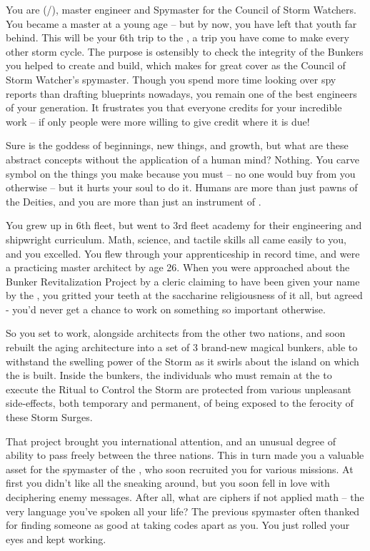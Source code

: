 \documentclass[char]{GL2020}
\begin{document}
\name{\cBunker{}}

You are \cBunker{\full} (\cBunker{\they}/\cBunker{\them}), master engineer and Spymaster for the \pShip{} Council of Storm Watchers. You became a master at a young age -- but by now, you have left that youth far behind. This will be your 6th trip to the \pSchool{}, a trip you have come to make every other storm cycle. The purpose is ostensibly to check the integrity of the Bunkers you helped to create and build, which makes for great cover as the Council of Storm Watcher's spymaster. Though you spend more time looking over spy reports than drafting blueprints nowadays, you remain one of the best engineers of your generation. It frustrates you that everyone credits \cFlowFull{\full} for your incredible work -- if only people were more willing to give credit where it is due!

Sure \cFlow{} is the goddess of beginnings, new things, and growth, but what are these abstract concepts without the application of a human mind? Nothing. You carve \cFlow{\their} symbol on the things you make because you must -- no one would buy from you otherwise -- but it hurts your soul to do it. Humans are more than just pawns of the Deities, and you are more than just an instrument of \cFlow{}. 

You grew up in 6th fleet, but went to 3rd fleet academy for their engineering and shipwright curriculum. Math, science, and tactile skills all came easily to you, and you excelled. You flew through your apprenticeship in record time, and were a practicing master architect by age 26. When you were approached about the Bunker Revitalization Project by a \cFlow{} cleric claiming to have been given your name by the \cFlow{\God} \cFlow{\themself}, you gritted your teeth at the saccharine religiousness of it all, but agreed - you'd never get a chance to work on something so important otherwise. 

So you set to work, alongside architects from the other two nations, and soon rebuilt the aging architecture into a set of 3 brand-new magical bunkers, able to withstand the swelling power of the Storm as it swirls about the island on which the \pSchool{} is built. Inside the bunkers, the individuals who must remain at the \pSc{} to execute the Ritual to Control the Storm are protected from various unpleasant side-effects, both temporary and permanent, of being exposed to the ferocity of these Storm Surges.

That project brought you international attention, and an unusual degree of ability to pass freely between the three nations. This in turn made you a valuable asset for the spymaster of the \pShip{}, who soon recruited you for various missions. At first you didn't like all the sneaking around, but you soon fell in love with deciphering enemy messages. After all, what are ciphers if not applied math -- the very language you've spoken all your life? The previous spymaster often thanked \cEbb{} for finding someone as good at taking codes apart as you. You just rolled your eyes and kept working.
\end{document}
